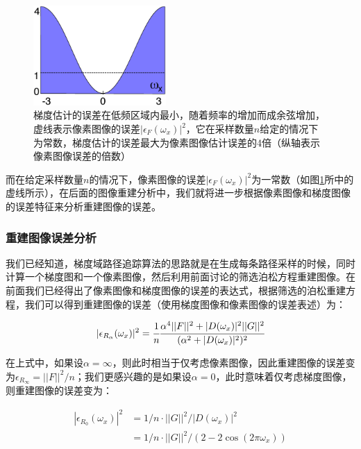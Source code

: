 \begin{figure}
	\sidecaption
	\includegraphics[width=0.45\textwidth]{figures/pt/gradient-error}
	\caption{梯度估计的误差在低频区域内最小，随着频率的增加而成余弦增加，虚线表示像素图像的误差$|\epsilon_F(\omega_x)|^2$，它在采样数量$n$给定的情况下为常数，梯度估计的误差最大为像素图像估计误差的4倍（纵轴表示像素图像误差的倍数）}
	\label{f:pt-gradient-error}
\end{figure}

而在给定采样数量$n$的情况下，像素图像的误差$|\epsilon_F(\omega_x)|^2$为一常数（如图\ref{f:pt-gradient-error}所中的虚线所示），在后面的图像重建分析中，我们就将进一步根据像素图像和梯度图像的误差特征来分析重建图像的误差。






\subsubsection{重建图像误差分析}
我们已经知道，梯度域路径追踪算法的思路就是在生成每条路径采样的时候，同时计算一个梯度图和一个像素图像，然后利用前面讨论的筛选泊松方程重建图像。在前面我们已经得出了像素图像和梯度图像的误差的表达式，根据筛选的泊松重建方程，我们可以得到重建图像的误差（使用梯度图像和像素图像的误差表述）为：

\begin{equation}
	|\epsilon_{R_{\alpha}}(\omega_x)|^2= \cfrac{1}{n} \cfrac{\alpha^4||F||^2 +|D(\omega_x)|^2||G||^2}{(\alpha^2 + |D(\omega_x)|^2 )^2}
\end{equation}

\noindent 在上式中，如果设$\alpha=\infty$，则此时相当于仅考虑像素图像，因此重建图像的误差变为$\epsilon_{R_\infty}=||F||^2/n$；我们更感兴趣的是如果设$\alpha=0$，此时意味着仅考虑梯度图像，则重建图像的误差变为：

\begin{equation}
\begin{aligned}
	|\epsilon_{R_0}(\omega_x)|^2 &=1/n\cdot||G||^2/|D(\omega_x)|^2\\
	&=1/n\cdot||G||^2/(2-2\cos(2\pi\omega_x) )
\end{aligned}
\end{equation}

